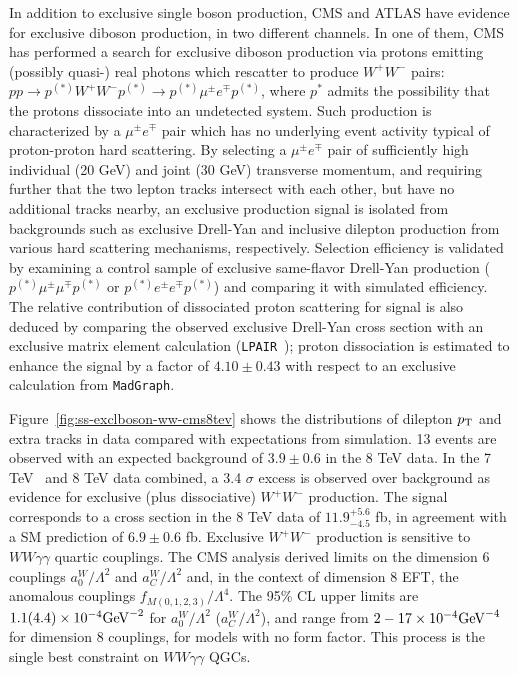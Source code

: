 
In addition to exclusive single boson production, CMS and ATLAS have
evidence for exclusive diboson production, in two different channels.
In one of them, CMS~\cite{Khachatryan:2016mud} has performed a search
for exclusive diboson production via protons emitting (possibly
quasi-) real photons which rescatter to produce $W^+W^-$ pairs:
$pp \to p^{(*)}W^+ W^- p^{(*)} \to p^{(*)}\mu^{\pm}e^{\mp}p^{(*)}$,
where $p^*$ admits the possibility that the protons dissociate into an
undetected system.  Such production is characterized by a
$\mu^{\pm}e^{\mp}$ pair which has no underlying event activity typical
of proton-proton hard scattering.  By selecting a $\mu^{\pm}e^{\mp}$
pair of sufficiently high individual (20 GeV) and joint (30 GeV)
transverse momentum, and requiring further that the two lepton tracks
intersect with each other, but have no additional tracks nearby, an
exclusive production signal is isolated from backgrounds such as
exclusive Drell-Yan and inclusive dilepton production from various
hard scattering mechanisms, respectively.  Selection efficiency is
validated by examining a control sample of exclusive same-flavor
Drell-Yan production ($p^{(*)}\mu^{\pm}\mu^{\mp}p^{(*)}$ or
$p^{(*)}e^{\pm}e^{\mp}p^{(*)}$) and comparing it with simulated
efficiency.  The relative contribution of dissociated proton
scattering for signal is also deduced by comparing the observed
exclusive Drell-Yan cross section with an exclusive matrix element
calculation (\texttt{LPAIR}~\cite{Vermaseren:1982cz,Baranov:1991yq});
proton dissociation is estimated to enhance the signal by a factor of
$4.10 \pm 0.43$ with respect to an exclusive calculation
from \texttt{MadGraph}.

Figure~\ref{fig:ss-exclboson-ww-cms8tev} shows the distributions of
dilepton $p_{\mathrm{T}}$ and extra tracks in data compared with expectations
from simulation.  13 events are observed with an expected background
of $3.9\pm0.6$ in the 8 TeV data.  In the 7
TeV~\cite{Chatrchyan:2013foa} and 8 TeV data combined, a 3.4 $\sigma$
excess is observed over background as evidence for exclusive (plus
dissociative) $W^+W^-$ production.  The signal corresponds to a cross
section in the 8 TeV data of $11.9^{+5.6}_{-4.5}$ fb, in agreement
with a SM prediction of $6.9\pm0.6$ fb.  Exclusive $W^+W^-$ production
is sensitive to $WW\gamma\gamma$ quartic couplings. The CMS analysis
derived limits on the dimension 6 couplings $a^W_0/\Lambda^2$ and
$a^W_C/\Lambda^2$ and, in the context of dimension 8 EFT, the
anomalous couplings $f_{M(0,1,2,3)}/\Lambda^4$.  The 95\% CL upper
limits are $1.1(4.4)\times 10^{-4} \rm{GeV}^{-2}$ for
$a^W_0/\Lambda^2$ ($a^W_C/\Lambda^2$), and range from $2-17 \times
10^{-4} \rm{GeV}^{-4}$ for dimension 8 couplings, for models with no
form factor.  This process is the single best constraint on
$WW\gamma\gamma$ QGCs.


